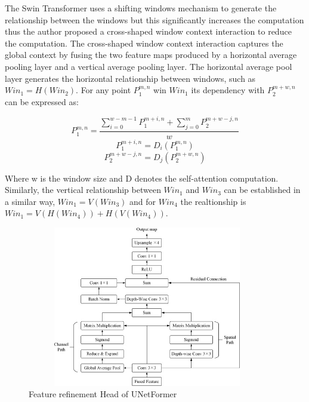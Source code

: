 The Swin Transformer uses a shifting windows mechanism to generate the relationship between the windows but this significantly increases the computation thus the author proposed  a cross-shaped window context interaction to reduce the computation. The cross-shaped window context interaction captures the global context by fusing the two feature maps produced by a horizontal average pooling layer and a vertical average pooling layer. The horizontal average pool layer generates the horizontal relationship between windows, such as $Win_1 = H(Win_2)$. For any point $P^{m,n}_1$ win $Win_1$ its dependency with $P^{m+w,n}_2$ can be expressed as:

\begin{equation}
    P^{m,n}_1 = \frac{\sum^{w-m-1}_{i=0}P^{m+i,n}_1 + \sum^m_{j=0}P^{m+w-j,n}_2}{w}
\end{equation}
\begin{equation}
    P^{m+i,n}_1 = D_i (P^{m,n}_1)
\end{equation}
\begin{equation}
    P^{m+w-j,n}_2 = D_j(P^{m+w,n}_2)
\end{equation}

\FloatBarrier
Where w is the window size and D denotes the self-attention computation. Similarly, the vertical relationship between $Win_1$ and $Win_3$ can be established in a similar way, $Win_1 = V(Win_3)$ and for $Win_4$ the realtionship is $Win_1 = V(H(Win_4)) + H(V(Win_4))$. 

\FloatBarrier

\begin{figure}[ht]
\includegraphics[width=10.5cm, height=7cm]{images/frh.jpg}
\centering
\caption{Feature refinement Head of UNetFormer}
\label{fig:frh}
\end{figure}

\FloatBarrier

